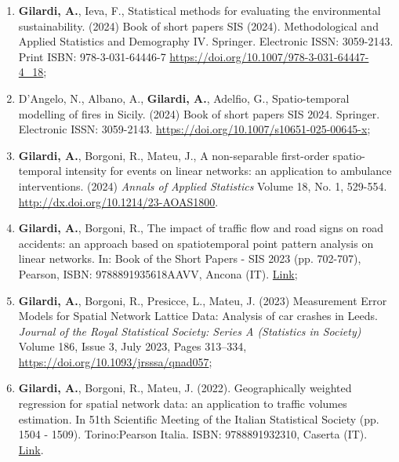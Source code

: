 \documentclass[11pt,a4paper,sans]{moderncv}
\begin{document}
  \begin{enumerate}
  \item \textbf{Gilardi, A.}, Ieva, F., Statistical methods for evaluating the environmental sustainability. (2024) Book of short papers SIS (2024). Methodological and Applied Statistics and Demography IV. Springer. Electronic ISSN: 3059-2143. Print ISBN: 978-3-031-64446-7 \url{https://doi.org/10.1007/978-3-031-64447-4_18}; 
  \item D'Angelo, N., Albano, A., \textbf{Gilardi, A.}, Adelfio, G., Spatio-temporal modelling of fires in Sicily. (2024) Book of short papers SIS 2024. Springer. Electronic ISSN: 3059-2143. \url{https://doi.org/10.1007/s10651-025-00645-x}; 
  \item \textbf{Gilardi, A.}, Borgoni, R., Mateu, J., A non-separable first-order spatio-temporal intensity for events on linear networks: an application to ambulance interventions. (2024) \textit{Annals of Applied Statistics} Volume 18, No. 1, 529-554. \url{http://dx.doi.org/10.1214/23-AOAS1800}.
  \item \textbf{Gilardi, A.}, Borgoni, R., The impact of traffic flow and road signs on road accidents: an approach based on spatiotemporal point pattern analysis on linear networks. In: Book of the Short Papers - SIS 2023 (pp. 702-707), Pearson, ISBN: 9788891935618AAVV, Ancona (IT). \href{https://it.pearson.com/content/dam/region-core/italy/pearson-italy/pdf/Docenti/Universit%C3%A0/bozza-book-compresso.pdf}{Link};  
  \item \textbf{Gilardi, A.}, Borgoni, R., Presicce, L., Mateu, J. (2023) Measurement Error Models for Spatial Network Lattice Data: Analysis of car crashes in Leeds. \textit{Journal of the Royal Statistical Society: Series A (Statistics in Society)} Volume 186, Issue 3, July 2023, Pages 313–334, \url{https://doi.org/10.1093/jrsssa/qnad057};
  \item \textbf{Gilardi, A.}, Borgoni, R., Mateu, J. (2022). Geographically weighted regression for spatial network data: an application to traffic volumes estimation. In 51th Scientific Meeting of the Italian Statistical Society (pp. 1504 - 1509). Torino:Pearson Italia. ISBN: 9788891932310, Caserta (IT). \href{https://it.pearson.com/content/dam/region-core/italy/pearson-italy/pdf/Docenti/Universit%C3%A0/Sis-2022-4c-low.pdf}{Link}. 

\end{enumerate}
\end{document}

